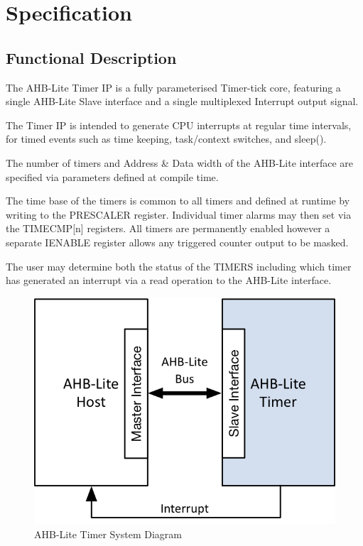 \chapter{Specification} \label{specifications}

\section{Functional Description}\label{functional-description}

The AHB-Lite Timer IP is a fully parameterised Timer-tick core,
featuring a single AHB-Lite Slave interface and a single multiplexed
Interrupt output signal.

The Timer IP is intended to generate CPU interrupts at regular time
intervals, for timed events such as time keeping, task/context switches,
and sleep().

The number of timers and Address \& Data width of the AHB-Lite interface
are specified via parameters defined at compile time.

The time base of the timers is common to all timers and defined at
runtime by writing to the PRESCALER register. Individual timer alarms
may then set via the TIMECMP{[}n{]} registers. All timers are
permanently enabled however a separate IENABLE register allows any
triggered counter output to be masked.

The user may determine both the status of the TIMERS including which
timer has generated an interrupt via a read operation to the AHB-Lite
interface.

\begin{figure}[tbh]
	\centering
	\includegraphics{assets/img/AHB-Lite-Timer-sys.png}
	\caption{AHB-Lite Timer System Diagram}
	\label{fig:ahb-lite-timer-sys}
\end{figure}
